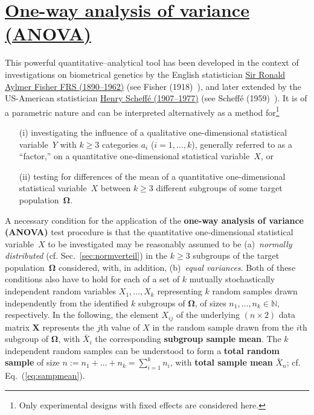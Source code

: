\section[One-way analysis of variance (ANOVA)]{\href{https://www.youtube.com/watch?v=viiFi8zfLX0}{One-way analysis of variance (ANOVA)}}
This powerful quantitative--analytical tool has been developed in 
the context of investigations on biometrical genetics by 
the English statistician
\href{http://www-history.mcs.st-and.ac.uk/Biographies/Fisher.html}{Sir
Ronald Aylmer Fisher FRS (1890--1962)} (see Fisher 
(1918)~), and later extended by the
US-American statistician
\href{http://en.wikipedia.org/wiki/Henry_Scheffe}{Henry
Scheff\'{e} (1907--1977)} (see Scheff\'{e} (1959)~). 
It is of a parametric nature and can be interpreted alternatively 
as a method for\footnote{Only experimental designs with fixed 
effects are considered here.}
%
\begin{itemize}
\item[(i)] investigating the influence of a qualitative 
one-dimensional statistical variable~$Y$ with $k \geq 3$ 
categories $a_{i}$ ($i=1,\ldots,k$), generally referred to as a 
``factor,'' on a quantitative one-dimensional statistical 
variable~$X$, or\\[-0.5cm]
\item[(ii)] testing for differences of the mean of a quantitative 
one-dimensional statistical variable~$X$ between $k \geq 3$ 
different subgroups of some target 
population~$\boldsymbol{\Omega}$.\\[-0.5cm]
\end{itemize}
%
A necessary condition for the application of the \textbf{one-way 
analysis of variance (ANOVA)} test procedure is that the 
quantitative one-dimensional statistical variable~$X$ to be 
investigated may be reasonably assumed to be (a)~\textit{normally 
distributed} (cf. Sec.~\ref{sec:normverteil}) in the $k \geq 3$ 
subgroups of the target population~$\boldsymbol{\Omega}$ 
considered, with, in addition, (b)~\textit{equal variances}. Both
of these conditions also have to hold for each of a set of $k$ 
mutually stochastically independent random variables $X_{1}, 
\ldots, X_{k}$ representing $k$ random samples drawn independently 
from the identified $k$ subgroups of $\boldsymbol{\Omega}$, of 
sizes $n_{1}, \ldots, n_{k} \in \mathbb{N}$, respectively. In the 
following, the element $X_{ij}$ of the underlying $(n \times 2)$ 
data matrix $\boldsymbol{X}$ represents the $j$th value of $X$ in 
the random sample drawn from the $i$th subgroup of 
$\boldsymbol{\Omega}$, with $\bar{X}_{i}$ the corresponding
\textbf{subgroup sample mean}. The $k$ independent random samples
can be understood to form a \textbf{total random sample} of size 
$\displaystyle n:=n_{1}+\ldots+n_{k} =\sum_{i=1}^{k}n_{i}$, with 
\textbf{total sample mean} $\bar{X}_{n}$; cf.
Eq.~(\ref{eq:sampmean}).


